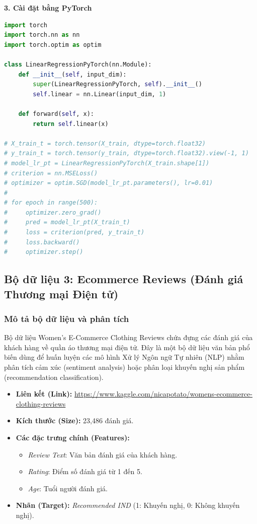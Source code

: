 \documentclass[12pt,a4paper]{article}
\begin{document}
\textbf{3. Cài đặt bằng PyTorch}
\begin{lstlisting}[language=Python]
import torch
import torch.nn as nn
import torch.optim as optim

class LinearRegressionPyTorch(nn.Module):
    def __init__(self, input_dim):
        super(LinearRegressionPyTorch, self).__init__()
        self.linear = nn.Linear(input_dim, 1)
        
    def forward(self, x):
        return self.linear(x)

# X_train_t = torch.tensor(X_train, dtype=torch.float32)
# y_train_t = torch.tensor(y_train, dtype=torch.float32).view(-1, 1)
# model_lr_pt = LinearRegressionPyTorch(X_train.shape[1])
# criterion = nn.MSELoss()
# optimizer = optim.SGD(model_lr_pt.parameters(), lr=0.01)
#
# for epoch in range(500):
#     optimizer.zero_grad()
#     pred = model_lr_pt(X_train_t)
#     loss = criterion(pred, y_train_t)
#     loss.backward()
#     optimizer.step()
\end{lstlisting}

\newpage
\subsection{Bộ dữ liệu 3: Ecommerce Reviews (Đánh giá Thương mại Điện tử)}

\subsubsection{Mô tả bộ dữ liệu và phân tích}
Bộ dữ liệu Women's E-Commerce Clothing Reviews chứa đựng các đánh giá của khách hàng về quần áo thương mại điện tử. Đây là một bộ dữ liệu văn bản phổ biến dùng để huấn luyện các mô hình Xử lý Ngôn ngữ Tự nhiên (NLP) nhằm phân tích cảm xúc (sentiment analysis) hoặc phân loại khuyến nghị sản phẩm (recommendation classification).

\begin{itemize}
    \item \textbf{Liên kết (Link):} \url{https://www.kaggle.com/nicapotato/womens-ecommerce-clothing-reviews}
    \item \textbf{Kích thước (Size):} 23,486 đánh giá.
    \item \textbf{Các đặc trưng chính (Features):}
    \begin{itemize}
        \item \textit{Review Text}: Văn bản đánh giá của khách hàng.
        \item \textit{Rating}: Điểm số đánh giá từ 1 đến 5.
        \item \textit{Age}: Tuổi người đánh giá.
    \end{itemize}
    \item \textbf{Nhãn (Target):} \textit{Recommended IND} (1: Khuyến nghị, 0: Không khuyến nghị).
\end{itemize}
\end{document}
